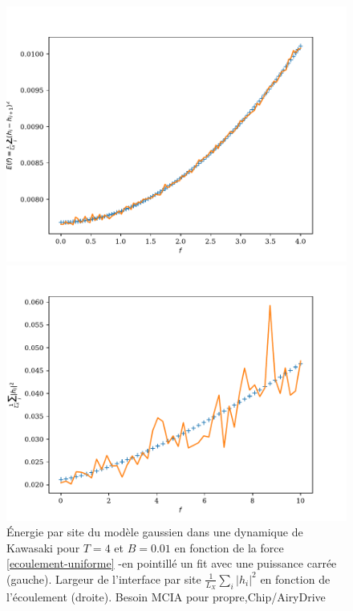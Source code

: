 \begin{figure}[t]
	\begin{minipage}[t]{0.5\linewidth}
		\includegraphics[width=\linewidth]{sosequi-laser/ene-kaw-airy.pdf}
	\end{minipage}%
	\begin{minipage}[t]{0.5\linewidth}
		\includegraphics[width=\linewidth]{sosequi-laser/sigma-kaw-airy.pdf}
	\end{minipage}%
	\caption{Énergie par site du modèle gaussien dans une dynamique de Kawasaki pour $T=4$ et $B=0.01$ en fonction de la force \ref{ecoulement-uniforme} -en pointillé un fit avec une puissance carrée (gauche). Largeur de l'interface par site $\frac{1}{L_X}\sum_i |h_i|^2$ en fonction de l'écoulement (droite). {\color{red} Besoin MCIA pour propre,Chip/AiryDrive}}
	\label{ene-kaw-airy}
\end{figure}

